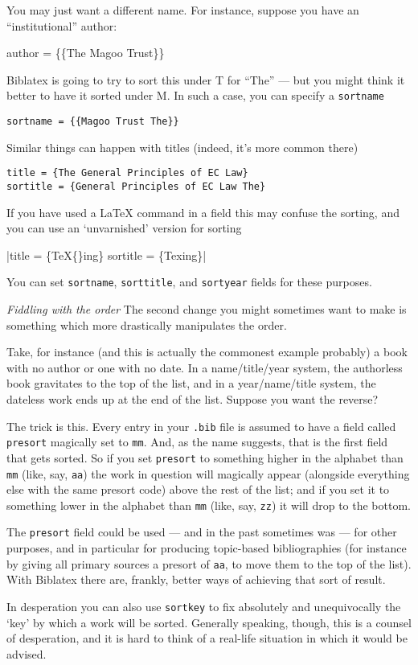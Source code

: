   You may just want a different name. For instance, suppose you have an
  ``institutional'' author:

  author = \{\{The Magoo Trust\}\}

Biblatex is going to try to sort this under T for ``The'' --- but you
might think it better to have it sorted under M. In such a case, you can
specify a \texttt{sortname}

\begin{verbatim}
sortname = {{Magoo Trust The}}
\end{verbatim}

Similar things can happen with titles (indeed, it's more common there)

\begin{verbatim}
title = {The General Principles of EC Law}
sortitle = {General Principles of EC Law The}
\end{verbatim}

  If you have used a LaTeX command in a field this may confuse the
  sorting, and you can use an `unvarnished' version for sorting

  |title = \{\TeX\{\}ing\} sortitle = \{Texing\}|

You can set \texttt{sortname}, \texttt{sorttitle}, and \texttt{sortyear}
fields for these purposes.

\emph{Fiddling with the order} The second change you might sometimes
want to make is something which more drastically manipulates the order.

Take, for instance (and this is actually the commonest example probably)
a book with no author or one with no date. In a name/title/year system,
the authorless book gravitates to the top of the list, and in a
year/name/title system, the dateless work ends up at the end of the
list. Suppose you want the reverse?

The trick is this. Every entry in your \texttt{.bib} file is assumed to
have a field called \texttt{presort} magically set to \texttt{mm}. And,
as the name suggests, that is the first field that gets sorted. So if
you set \texttt{presort} to something higher in the alphabet than
\texttt{mm} (like, say, \texttt{aa}) the work in question will magically
appear (alongside everything else with the same presort code) above the
rest of the list; and if you set it to something lower in the alphabet
than \texttt{mm} (like, say, \texttt{zz}) it will drop to the bottom.

The \texttt{presort} field could be used --- and in the past sometimes
was --- for other purposes, and in particular for producing topic-based
bibliographies (for instance by giving all primary sources a presort of
\texttt{aa}, to move them to the top of the list). With Biblatex there
are, frankly, better ways of achieving that sort of result.

In desperation you can also use \texttt{sortkey} to fix absolutely and
unequivocally the `key' by which a work will be sorted. Generally
speaking, though, this is a counsel of desperation, and it is hard to
think of a real-life situation in which it would be advised.
